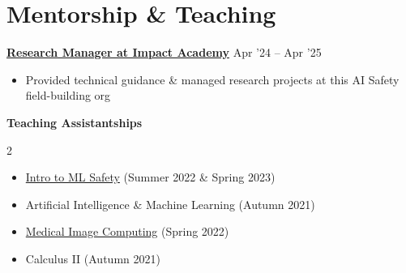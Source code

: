 
\section{Mentorship \& Teaching}

\textbf{\href{https://impactacademy.org/}{Research Manager at Impact Academy}} \hfill{Apr '24 -- Apr '25}\\
\begin{itemize}[topsep = -0.5mm, itemsep = -0.75 mm, leftmargin=*]
\item Provided technical guidance \& managed research projects at this AI Safety field-building org
\end{itemize}
\vspace{3pt}

\textbf{Teaching Assistantships}\\
\begin{minipage}[top]{220mm}
    \begin{multicols}{2}
        \begin{itemize}[leftmargin=*]
            \vspace{0mm}
            \item \href{https://course.mlsafety.org/}{Intro to ML Safety} (Summer 2022 \& Spring 2023)
            \vspace{-6pt}
            \item Artificial Intelligence \& Machine Learning (Autumn 2021)
            \item \href{https://www.cse.iitb.ac.in/~suyash/teaching/medical_image_computing.html}{Medical Image Computing} (Spring 2022)
            \vspace{-6pt}
            \item Calculus II (Autumn 2021)
        \end{itemize}
    \end{multicols}
\end{minipage}\\

\vspace{8pt}

